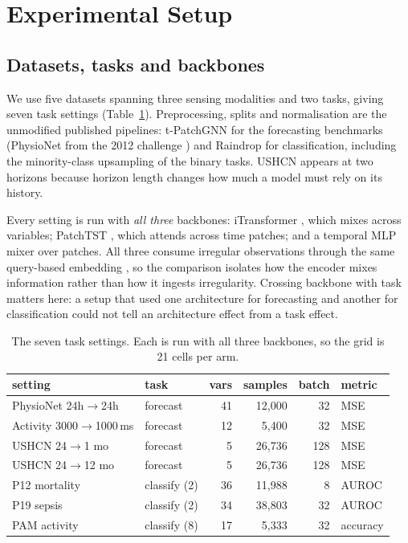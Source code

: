 
\section{Experimental Setup}
\label{sec:setup}

\subsection{Datasets, tasks and backbones}
We use five datasets spanning three sensing modalities and two tasks, giving seven task settings
(Table~\ref{tab:datasets}). Preprocessing, splits and normalisation are the unmodified published pipelines:
t-PatchGNN \cite{zhang2024tpatchgnn} for the forecasting benchmarks (PhysioNet from the 2012 challenge
\cite{silva2012physionet}) and Raindrop \cite{zhang2022raindrop} for classification, including the
minority-class upsampling of the binary tasks. USHCN appears at two horizons because horizon length changes how
much a model must rely on its history.

Every setting is run with \emph{all three} backbones: iTransformer \cite{liu2024itransformer}, which mixes across
variables; PatchTST \cite{nie2023patchtst}, which attends across time patches; and a temporal MLP mixer over
patches. All three consume irregular observations through the same query-based embedding \cite{lim2026quite}, so
the comparison isolates how the encoder mixes information rather than how it ingests irregularity. Crossing
backbone with task matters here: a setup that used one architecture for forecasting and another for
classification could not tell an architecture effect from a task effect.

\begin{table}[t]
\caption{The seven task settings. Each is run with all three backbones, so the grid is 21 cells per arm.}
\label{tab:datasets}
\small
\begin{tabular}{llrrrl}
\toprule
setting & task & vars & samples & batch & metric \\
\midrule
PhysioNet 24h$\to$24h & forecast & 41 & 12{,}000 & 32 & MSE \\
Activity 3000$\to$1000\,ms & forecast & 12 & 5{,}400 & 32 & MSE \\
USHCN 24$\to$1 mo & forecast & 5 & 26{,}736 & 128 & MSE \\
USHCN 24$\to$12 mo & forecast & 5 & 26{,}736 & 128 & MSE \\
P12 mortality & classify (2) & 36 & 11{,}988 & 8 & AUROC \\
P19 sepsis & classify (2) & 34 & 38{,}803 & 32 & AUROC \\
PAM activity & classify (8) & 17 & 5{,}333 & 32 & accuracy \\
\bottomrule
\end{tabular}
\end{table}

